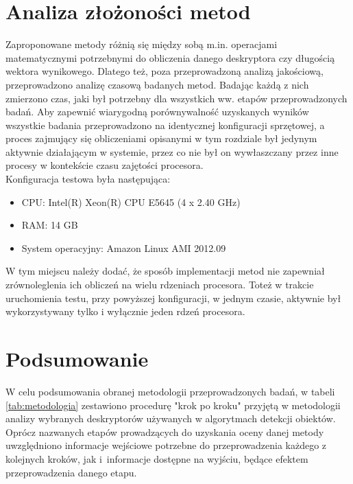 \section{Analiza złożoności metod}
\label{sec:zlozonosc}

Zaproponowane metody różnią się między sobą m.in. operacjami matematycznymi potrzebnymi do obliczenia danego deskryptora czy długością wektora wynikowego.
Dlatego też, poza przeprowadzoną analizą jakościową,
przeprowadzono analizę czasową badanych metod. Badając każdą z nich
zmierzono czas, jaki był potrzebny dla wszystkich ww. etapów przeprowadzonych badań. Aby zapewnić wiarygodną porównywalność uzyskanych wyników wszystkie badania przeprowadzono na identycznej konfiguracji sprzętowej, a proces zajmujący się obliczeniami opisanymi w tym rozdziale był jedynym aktywnie działającym w systemie, przez co nie był on wywłaszczany przez inne procesy w kontekście czasu zajętości procesora.\\
Konfiguracja testowa była następująca:

\begin{itemize}
\item CPU: Intel(R) Xeon(R) CPU E5645 (4 x 2.40 GHz)
\item RAM: 14 GB
\item System operacyjny: Amazon Linux AMI 2012.09
\end{itemize}

W tym miejscu należy dodać, że sposób implementacji metod nie zapewniał zrównoleglenia ich obliczeń na wielu rdzeniach procesora. Toteż w trakcie uruchomienia testu, przy powyższej konfiguracji, w jednym czasie, aktywnie był wykorzystywany tylko i wyłącznie jeden rdzeń procesora.

\section{Podsumowanie}
\label{sec:podsmetodologia}
W celu podsumowania obranej metodologii przeprowadzonych badań, w tabeli \ref{tab:metodologia} zestawiono procedurę "krok po kroku" przyjętą w
metodologii analizy wybranych deskryptorów używanych w algorytmach
detekcji obiektów. Oprócz nazwanych etapów prowadzących do uzyskania
oceny danej metody uwzględniono informacje wejściowe potrzebne do
przeprowadzenia każdego z kolejnych kroków, jak i~informacje dostępne
na wyjściu, będące efektem przeprowadzenia danego etapu.

